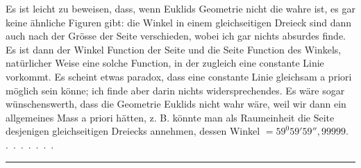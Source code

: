 Es ist leicht zu beweisen, dass, wenn Euklids Geometrie nicht die wahre ist,
es gar keine ähnliche Figuren gibt: die Winkel in einem gleichseitigen Dreieck
sind dann auch nach der Grösse der Seite verschieden, wobei ich gar nichts
absurdes finde. Es ist dann der Winkel Function der Seite und die Seite Function
des Winkels, natürlicher Weise eine solche Function, in der zugleich eine
constante Linie vorkommt. Es scheint etwas paradox, dass eine constante Linie
  gleichsam a priori möglich sein könne; ich finde aber darin nichts
widersprechendes. Es wäre sogar wünschenswerth, dass die Geometrie Euklids nicht
  wahr wäre, weil wir dann ein allgemeines Mass a priori hätten, z. B.
könnte man als Raumeinheit die Seite desjenigen gleichseitigen Dreiecks annehmen,
  dessen Winkel $=59^{0} 59' 59''{,}99999$. .\ .\ .\ .\ .\ .\ .

\begin{center}\rule{3cm}{0.4pt}\end{center}
